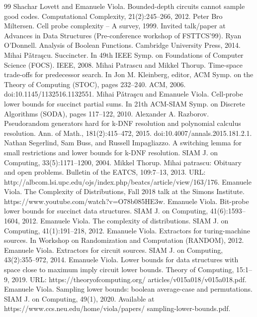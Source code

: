 \documentclass[10pt,a4paper]{article}
\begin{document}
\begin{thebibliography}{99}
 Shachar Lovett and Emanuele Viola. Bounded-depth circuits cannot sample good codes. Computational Complexity, 21(2):245–266, 2012.
 Peter Bro Miltersen. Cell probe complexity – A survey, 1999. Invited talk/paper at Advances in Data Structures (Pre-conference workshop of FSTTCS’99).
 Ryan O’Donnell. Analysis of Boolean Functions. Cambridge University Press, 2014.
 Mihai Pǎtraşcu. Succincter. In 49th IEEE Symp. on Foundations of Computer Science (FOCS). IEEE, 2008.
 Mihai Patrascu and Mikkel Thorup. Time-space trade-offs for predecessor search. In Jon M. Kleinberg, editor, ACM Symp. on the Theory of Computing (STOC), pages 232–240. ACM, 2006. doi:10.1145/1132516.1132551.
 Mihai Pǎtraşcu and Emanuele Viola. Cell-probe lower bounds for succinct partial sums. In 21th ACM-SIAM Symp. on Discrete Algorithms (SODA), pages 117–122, 2010.
 Alexander A. Razborov. Pseudorandom generators hard for k-DNF resolution and polynomial calculus resolution. Ann. of Math., 181(2):415–472, 2015. doi:10.4007/annals.2015.181.2.1.
 Nathan Segerlind, Sam Buss, and Russell Impagliazzo. A switching lemma for small restrictions and lower bounds for k-DNF resolution. SIAM J. on Computing, 33(5):1171–1200, 2004.
 Mikkel Thorup. Mihai patrascu: Obituary and open problems. Bulletin of the EATCS, 109:7–13, 2013. URL: http://albcom.lsi.upc.edu/ojs/index.php/beatcs/article/view/163/176.
 Emanuele Viola. The Complexity of Distributions, Fall 2018 talk at the Simons Institute. https://www.youtube.com/watch?v=O78b085HE3w.
 Emanuele Viola. Bit-probe lower bounds for succinct data structures. SIAM J. on Computing, 41(6):1593–1604, 2012.
 Emanuele Viola. The complexity of distributions. SIAM J. on Computing, 41(1):191–218, 2012.
 Emanuele Viola. Extractors for turing-machine sources. In Workshop on Randomization and Computation (RANDOM), 2012.
 Emanuele Viola. Extractors for circuit sources. SIAM J. on Computing, 43(2):355–972, 2014.
 Emanuele Viola. Lower bounds for data structures with space close to maximum imply circuit lower bounds. Theory of Computing, 15:1–9, 2019. URL: https://theoryofcomputing.org/ articles/v015a018/v015a018.pdf.
 Emanuele Viola. Sampling lower bounds: boolean average-case and permutations. SIAM J. on Computing, 49(1), 2020. Available at https://www.ccs.neu.edu/home/viola/papers/ sampling-lower-bounds.pdf.

\end{thebibliography}
\end{document}
